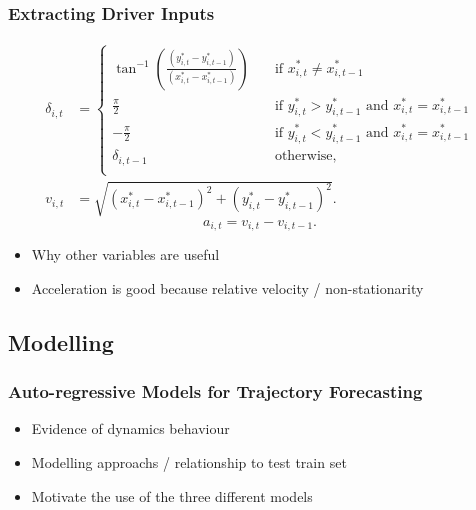 \documentclass[8pt]{beamer}\usepackage[]{graphicx}\usepackage[]{color}
\begin{document}
\begin{frame}
\frametitle{Extracting Driver Inputs}
\begin{align}
\delta_{i, t} &= 
     \begin{cases}
       \tan^{-1}\left(\frac{(y^*_{i, t} - y^*_{i, t-1})}{(x^*_{i, t} - x^*_{i, t-1})} \right)  &\quad\text{if }x^*_{i, t} \neq x^*_{i, t-1} \\
       \frac{\pi}{2} &\quad\text{if } y^*_{i, t} > y^*_{i, t-1} \mbox{ and } x^*_{i, t} = x^*_{i, t-1} \\
       -\frac{\pi}{2} &\quad\text{if } y^*_{i, t} < y^*_{i, t-1} \mbox{ and } x^*_{i, t} = x^*_{i, t-1} \\
       \delta_{i, t-1} &\quad\text{otherwise,} \\ 
     \end{cases} \label{dEq} \\
v_{i, t} &= \sqrt{(x^*_{i, t} - x^*_{i, t-1})^2 + (y^*_{i, t} - y^*_{i, t-1})^2} \label{vEq}.
\end{align}
\begin{equation}
\label{aEq}
a_{i, t} = v_{i, t} - v_{i, t-1}. 
\end{equation}
\begin{itemize}
\item Why other variables are useful
\item Acceleration is good because relative velocity / non-stationarity
\end{itemize}
\end{frame}

\begin{frame}
\subsection{Modelling}
\frametitle{Auto-regressive Models for Trajectory Forecasting}
\begin{itemize}
\item Evidence of dynamics behaviour
\item Modelling approachs / relationship to test train set
\item Motivate the use of the three different models
\end{itemize}
\end{frame}
\end{document}
